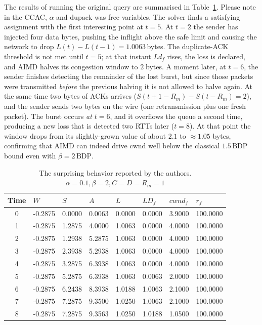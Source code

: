 \documentclass[12pt]{l4dc2023}
\begin{document}
The results of running the original query are summarised in Table~\ref{tab:aimd_1}. Please note in the CCAC, $\alpha$ and $\mathrm{dupack}$ was free variables. The solver finds a satisfying assignment with the first interesting point at \(t=5\). At \(t=2\) the sender has injected four data bytes, pushing the inflight above the safe limit and causing the network to drop \(L(t)-L(t-1)=1.0063\)\,bytes. The duplicate-ACK threshold is not met until \(t=5\); at that instant \(Ld_f\) rises, the loss is declared, and AIMD halves its congestion window to \(2\;\)bytes. A moment later, at \(t=6\), the sender finishes detecting the remainder of the lost burst, but since those packets were transmitted \emph{before} the previous halving it is not allowed to halve again. At the same time two bytes of ACKs arrives (\(S(t+1-R_m)-S(t-R_m)=2\)), and the sender sends two bytes on the wire (one retransmission plus one fresh packet). The burst occurs \emph{at \(t=6\)}, and it overflows the queue a second time, producing a new loss that is detected two RTTs later (\(t=8\)). At that point the window drops from its slightly-grown value of about \(2.1\) to \(\approx1.05\) bytes, confirming that AIMD can indeed drive \(\mathrm{cwnd}\) well below the classical \(1.5\,\text{BDP}\) bound even with \(\beta=2\,\text{BDP}\). 

\begin{table}[ht]
\centering
\begin{tabular}{|c|l|l|l|l|l|l|l|}
\hline
\textbf{Time} & \textbf{$W$} & \textbf{$S$} & \textbf{$A$} & \textbf{$L$} & \textbf{$LD_f$} & \textbf{$cwnd_f$} & \textbf{$r_f$} \\
\hline
0 & -0.2875 & 0.0000 & 0.0063 & 0.0000 & 0.0000 & 3.9000 & 100.0000 \\
1 & -0.2875 & 1.2875 & 4.0000 & 1.0063 & 0.0000 & 4.0000 & 100.0000 \\
2 & -0.2875 & 1.2938 & 5.2875 & 1.0063 & 0.0000 & 4.0000 & 100.0000 \\
3 & -0.2875 & 2.3938 & 5.2938 & 1.0063 & 0.0000 & 4.0000 & 100.0000 \\
4 & -0.2875 & 3.2875 & 6.3938 & 1.0063 & 0.0000 & 4.0000 & 100.0000 \\
5 & -0.2875 & 5.2875 & 6.3938 & 1.0063 & 0.0063 & 2.0000 & 100.0000 \\
6 & -0.2875 & 6.2438 & 8.3938 & 1.0188 & 1.0063 & 2.1000 & 100.0000 \\
7 & -0.2875 & 7.2875 & 9.3500 & 1.0250 & 1.0063 & 2.1000 & 100.0000 \\
8 & -0.2875 & 7.2875 & 9.3563 & 1.0250 & 1.0188 & 1.0500 & 100.0000 \\
\hline
\end{tabular}
\caption{The surprising behavior reported by the authors. $\alpha=0.1, \beta=2, C=D=R_m=1$}
\label{tab:aimd_1}
\end{table}
\end{document}
